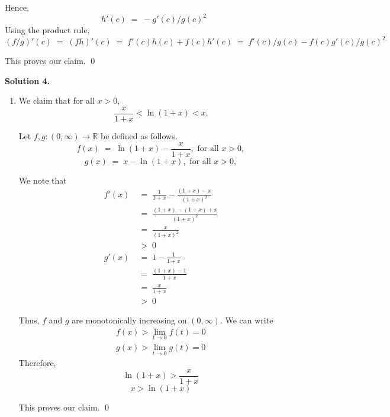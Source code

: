 \documentclass[10pt]{article}
\begin{document}
\begin{enumerate}
                Hence,
                \[
                h'(c) \;=\; -g'(c)/g(c)^2
                \]
                Using the product rule,
                \[
                (f /g)'(c) \;=\; (fh)'(c) \;=\; f'(c)h(c) + f(c)h'(c) \;=\; f'(c)/g(c) - f(c)g'(c)/g(c)^2
                \]

                This proves our claim. \qed
        \end{enumerate}
        
        \textbf{Solution 4.}
        \begin{enumerate}
                \item We claim that for all $x > 0$,
                \[ \frac{x}{1 + x} < \ln(1 + x) < x. \]

                Let $f, g\colon (0, \infty) \to \mathbb{R}$ be defined as follows.
                \[f(x) \;=\; \ln(1 + x) - \frac{x}{1 + x}, \text{ for all } x > 0,\]
                \[g(x) \;=\; x - \ln(1 + x), \text{ for all } x > 0,\]

                We note that
                \begin{align*}
                        f'(x) \;&=\; \frac{1}{1 + x} - \frac{(1 + x) - x}{(1 + x)^2} \\
                                \;&=\; \frac{(1 + x) - (1 + x) + x}{(1 + x)^2} \\
                                \;&=\; \frac{x}{(1 + x)^2} \\
                                \;&>\; 0 \\
                        g'(x) \;&=\; 1 - \frac{1}{1 + x} \\
                                \;&=\; \frac{(1 + x) - 1}{1 + x} \\
                                \;&=\; \frac{x}{1 + x} \\
                                \;&>\; 0
                \end{align*}

                Thus, $f$ and $g$ are monotonically increasing on $(0, \infty)$. We can write
                \begin{align*}
                        f(x) > \lim_{t \to 0} f(t) = 0 \\
                        g(x) > \lim_{t \to 0} g(t) = 0
                \end{align*}
                Therefore, 
                \[\ln(1 + x) > \frac{x}{1 + x}\]
                \[x > \ln(1 + x)\]

                This proves our claim. \qed


\end{enumerate}
\end{document}
